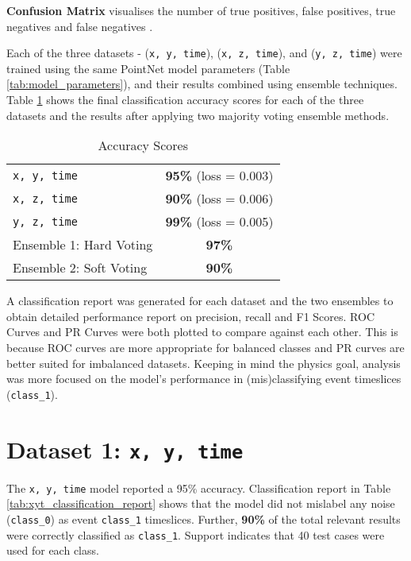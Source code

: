 \textbf{Confusion Matrix} visualises the number of true positives, false positives, true negatives and false negatives \cite{jaffery2009measuring} . 

Each of the three datasets - (\texttt{x, y, time}),  (\texttt{x, z, time}), and (\texttt{y, z, time}) were trained using the same PointNet model parameters (Table \ref{tab:model_parameters}), and their results combined using ensemble techniques. Table \ref{tab:results} shows the final classification accuracy scores for each of the three datasets and the results after applying two majority voting ensemble methods. 

\begin{table} [ht!]
    \centering
    \begin{tabular}{l c}
    \hline
        \texttt{x, y, time} & \textbf{95\% } (loss = 0.003)\\
        \texttt{x, z, time} & \textbf{90\%} (loss = 0.006)\\
        \texttt{y, z, time} & \textbf{99\%} (loss = 0.005)\\
        Ensemble 1: Hard Voting & \textbf{97\%}\\
        Ensemble 2: Soft Voting & \textbf{90\%}\\
    \hline
    \end{tabular}
    \caption{Accuracy Scores}
    \label{tab:results}
\end{table}

A classification report was generated for each dataset and the two ensembles to obtain detailed performance report on precision, recall and F1 Scores. ROC Curves and PR Curves were both plotted to compare against each other. This is because ROC curves are more appropriate for balanced classes and PR curves are better suited for imbalanced datasets. Keeping in mind the physics goal, analysis was more focused on the model's performance in (mis)classifying event timeslices (\texttt{class\_1}). 

\section{Dataset 1: \texttt{x, y, time}}

The \texttt{x, y, time} model reported a 95\% accuracy. Classification report in Table \ref{tab:xyt_classification_report} shows that the model did not mislabel any noise (\texttt{class\_0}) as event \texttt{class\_1} timeslices. Further, \textbf{90\%} of the total relevant results were correctly classified as \texttt{class\_1}. Support indicates that 40 test cases were used for each class.

